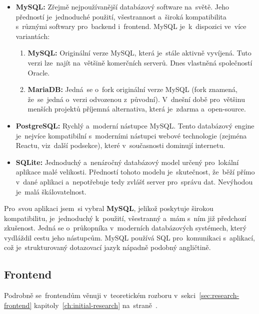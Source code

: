 \begin{itemize}
    \item \textbf{MySQL:} Zřejmě nejpoužívanější databázový software na~světě.
        Jeho předností je~jednoduché použití, všestrannost a~široká
        kompatibilita s~různými softwary pro~backend i~frontend. MySQL
        je~k~dispozici ve~více variantách:
        \begin{enumerate}
            \item \textbf{MySQL:} Originální verze MySQL, která je~stále
                aktivně vyvíjená. Tuto verzi lze~najít na~většině komerčních
                serverů. Dnes vlastněná společností Oracle.
            \item \textbf{MariaDB:} Jedná~se o~fork originální verze MySQL
                (fork znamená, že~se~jedná o~verzi odvozenou z~původní).
                V~dnešní době pro~většinu menších projektů příjemná
                alternativa, která je~zdarma a~open-source.
        \end{enumerate}
    \item \textbf{PostgreSQL:} Rychlý a~moderní nástupce MySQL. Tento
        databázový engine je~nejvíce kompatibilní s~moderními nástupci
        webové technologie (zejména Reactu, viz~další podsekce), které
        v~současnosti dominují internetu.
    \item \textbf{SQLite:} Jednoduchý a~nenáročný databázový model určený
        pro~lokální aplikace malé velikosti. Předností tohoto modelu
        je~skutečnost, že~běží přímo v~dané aplikaci a~nepotřebuje tedy
        zvlášť server pro~správu dat. Nevýhodou je~malá škálovatelnost.
\end{itemize}

Pro~svou aplikaci jsem~si vybral \textbf{MySQL}, jelikož poskytuje širokou
kompatibilitu, je~jednoduchý k~použití, všestranný a~mám s~ním již předchozí
zkušenost. Jedná se o~průkopníka v~moderních databázových systémech, který
vydláždil cestu jeho nástupcům. MySQL používá SQL pro~komunikaci s~aplikací,
což je~strukturovaný dotazovací jazyk nápadně podobný angličtině.

\subsection{Frontend}
\label{sec:preps-frontend}

Podrobně se~frontendům věnuji v~teoretickém rozboru
v~sekci~\ref{sec:research-frontend} kapitoly~\ref{ch:initial-research}
na~straně~\pageref{sec:research-frontend}.

